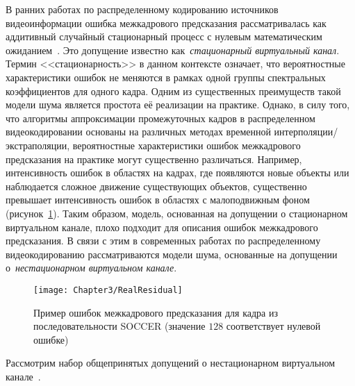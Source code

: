В ранних работах по распределенному кодированию источников видеоинформации ошибка межкадрового предсказания рассматривалась как аддитивный случайный стационарный процесс с нулевым математическим ожиданием~\cite{1246773}. Это допущение известно как~\emph{стационарный виртуальный канал}. Термин <<стационарность>> в данном контексте означает, что вероятностные характеристики ошибок не меняются в рамках одной группы спектральных коэффициентов для одного кадра. Одним из существенных преимуществ такой модели шума является простота её реализации на практике. Однако, в силу того, что алгоритмы аппроксимации промежуточных кадров в распределенном видеокодировании основаны на различных методах временной интерполяции/экстраполяции, вероятностные характеристики ошибок межкадрового предсказания на практике могут существенно различаться. Например, интенсивность ошибок в областях на кадрах, где появляются новые объекты или наблюдается сложное движение существующих объектов, существенно превышает интенсивность ошибок в областях с малоподвижным фоном (рисунок~\ref{fig:chap3:RealResidual}). Таким образом, модель, основанная на допущении о стационарном виртуальном канале, плохо подходит для описания ошибок межкадрового предсказания. В связи с этим в современных работах по распределенному видеокодированию рассматриваются модели шума, основанные на допущении о~\emph{нестационарном виртуальном канале}.

\begin{figure}[t]
  \centering
  \texttt{[image: Chapter3/RealResidual]}
  \caption{Пример ошибок межкадрового предсказания для кадра из последовательности SOCCER (значение $128$ соответствует нулевой ошибке)}
  \label{fig:chap3:RealResidual}
\end{figure}

Рассмотрим набор общепринятых допущений о нестационарном виртуальном канале~\cite{borchert2010distributed}.

